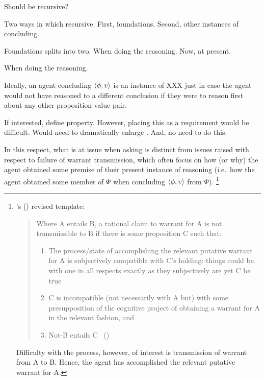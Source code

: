 \begin{note}
  Should \qzS{} be recursive?

  Two ways in which recursive.
  First, foundations.
  Second, other instances of concluding.
\end{note}

\begin{note}
  Foundations splits into two.
  When doing the reasoning.
  Now, at present.

  When doing the reasoning.

  Ideally, an agent concluding \(\langle \phi, v \rangle\) is an instance of XXX  just in case the agent would not have reasoned to a different conclusion if they were to reason first about any other proposition-value pair.

  If interested, define property.
  However, placing this as a requirement would be difficult.
  Would need to dramatically enlarge .
  And, no need to do this.

  In this respect, what is at issue when asking \qzS{} is distinct from issues raised with respect to failure of warrant transmission, which often focus on how (or why) the agent obtained some premise of their present instance of reasoning (i.e.\ how the agent obtained some member of \(\Phi\) when concluding \(\langle \phi, v \rangle\) from \(\Phi\)).%
  \footnote{
    \citeauthor{Wright:2011wn}'s (\citeyear{Wright:2011wn}) revised template:
    \begin{quote}
      Where A entails B, a rational claim to warrant for A is not transmissible to B if there is some proposition C such that:
      \begin{enumerate}[label=(\roman*), noitemsep]
      \item
        The process/state of accomplishing the relevant putative warrant for A is subjectively compatible with C’s holding: things could be with one in all respects exactly as they subjectively are yet C be true
      \item
        C is incompatible (not necessarily with A but) with some presupposition of the cognitive project of obtaining a warrant for A in the relevant fashion, and
      \item
        Not-B entails C%
      \mbox{ }\hfill\mbox{(\citeyear[93]{Wright:2011wn})}
      \end{enumerate}
    \end{quote}
    Difficulty with the process, however, of interest is transmission of warrant from A to B.
    Hence, the agent has accomplished the relevant putative warrant for A.

}
\end{note}
